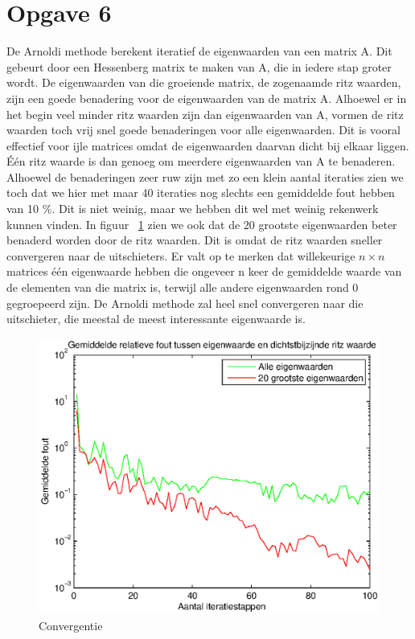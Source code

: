 \documentclass[]{article}
\newcommand{\opgave}[1]{\section*{Opgave #1}}
\begin{document}
\opgave{6}

De Arnoldi methode berekent iteratief de eigenwaarden van een matrix A. Dit gebeurt door een Hessenberg matrix te maken van A, die in iedere stap groter wordt. De eigenwaarden van die groeiende matrix, de zogenaamde ritz waarden, zijn een goede benadering voor de eigenwaarden van de matrix A. Alhoewel er in het begin veel minder ritz waarden zijn dan eigenwaarden van A, vormen de ritz waarden toch vrij snel goede benaderingen voor alle eigenwaarden. Dit is vooral effectief voor ijle matrices omdat de eigenwaarden daarvan dicht bij elkaar liggen. \'{E}\'{e}n ritz waarde is dan genoeg om meerdere eigenwaarden van A te benaderen. Alhoewel de benaderingen zeer ruw zijn met zo een klein aantal iteraties zien we toch dat we hier met maar 40 iteraties nog slechts een gemiddelde fout hebben van 10 $\%$. Dit is niet weinig, maar we hebben dit wel met weinig rekenwerk kunnen vinden. In figuur ~\ref{opgave6} zien we ook dat de 20 grootste eigenwaarden beter benaderd worden door de ritz waarden. Dit is omdat de ritz waarden sneller convergeren naar de uitschieters. 
\linebreak Er valt op te merken dat willekeurige $n\times n$ matrices \'{e}\'{e}n eigenwaarde hebben die ongeveer n keer de gemiddelde waarde van de elementen van die matrix is, terwijl alle andere eigenwaarden rond 0 gegroepeerd zijn. De Arnoldi methode zal heel snel convergeren naar die uitschieter, die meestal de meest interessante eigenwaarde is. 

\begin{figure}[h]
\noindent \includegraphics[width=1\linewidth]{Opgave6.eps}
\caption{Convergentie}
\label{opgave6}
\end{figure}
\end{document}
